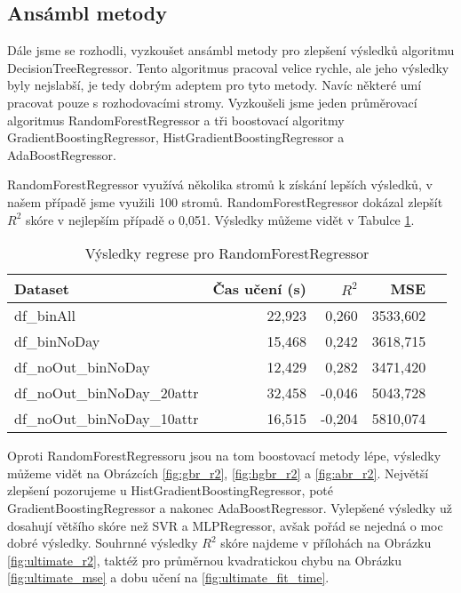 \documentclass[a4paper,12pt]{article}
\begin{document}
\subsection{Ansámbl metody}
Dále jsme se rozhodli, vyzkoušet ansámbl metody pro zlepšení výsledků algoritmu DecisionTreeRegressor. Tento algoritmus pracoval velice rychle,
ale jeho výsledky byly nejslabší, je tedy dobrým adeptem pro tyto metody. Navíc některé umí pracovat pouze s rozhodovacími stromy. 
Vyzkoušeli jsme jeden průměrovací algoritmus RandomForestRegressor a tři boostovací algoritmy GradientBoostingRegressor,
HistGradientBoostingRegressor a AdaBoostRegressor.

RandomForestRegressor využívá několika stromů k získání lepších výsledků, v našem případě jsme využili 100 stromů.
RandomForestRegressor dokázal zlepšít $R^2$ skóre v nejlepším případě o 0,051. Výsledky můžeme vidět v Tabulce \ref{tab:rfr}.

\begin{table}
    \centering
    \begin{tabular}{l | r | r | r  | r}
        Dataset                         & Čas učení (s) &  $R^2$    & MSE \\\hline\hline
        df\_binAll                      & 22,923        & 0,260     & 3533,602 \\ 
        df\_binNoDay                    & 15,468        & 0,242     & 3618,715 \\
        df\_noOut\_binNoDay             & 12,429        & 0,282     & 3471,420 \\
        df\_noOut\_binNoDay\_20attr     & 32,458        & -0,046    & 5043,728 \\
        df\_noOut\_binNoDay\_10attr     & 16,515        & -0,204    & 5810,074
    \end{tabular}
    \caption{Výsledky regrese pro RandomForestRegressor}
    \label{tab:rfr}
\end{table}

Oproti RandomForestRegressoru jsou na tom boostovací metody lépe, výsledky můžeme vidět na Obrázcích \ref{fig:gbr_r2}, \ref{fig:hgbr_r2} a \ref{fig:abr_r2}.
Největší zlepšení pozorujeme u HistGradientBoostingRegressor, poté GradientBoostingRegressor a nakonec AdaBoostRegressor.
Vylepšené výsledky už dosahují většího skóre než SVR a MLPRegressor, avšak pořád se nejedná o moc dobré výsledky.
Souhrnné výsledky $R^2$ skóre najdeme v přílohách na Obrázku \ref{fig:ultimate_r2}, taktéž pro průměrnou kvadratickou chybu
na Obrázku \ref{fig:ultimate_mse} a dobu učení na \ref{fig:ultimate_fit_time}.
\end{document}
